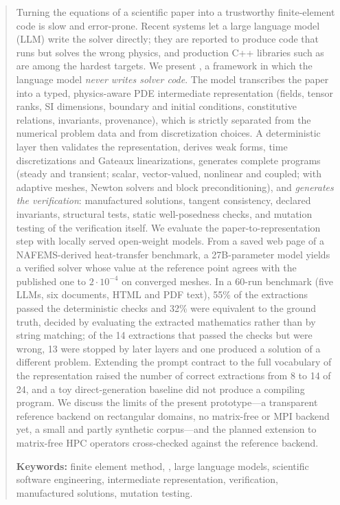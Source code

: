 \begin{abstract}
Turning the equations of a scientific paper into a trustworthy finite-element code is slow and error-prone. Recent systems let a large language model (LLM) write the solver directly; they are reported to produce code that runs but solves the wrong physics, and production C++ libraries such as \dealii{} are among the hardest targets. We present \femagent{}, a framework in which the language model \emph{never writes solver code}. The model transcribes the paper into a typed, physics-aware PDE intermediate representation (fields, tensor ranks, SI dimensions, boundary and initial conditions, constitutive relations, invariants, provenance), which is strictly separated from the numerical problem data and from discretization choices. A deterministic layer then validates the representation, derives weak forms, time discretizations and Gateaux linearizations, generates complete \dealii{} programs (steady and transient; scalar, vector-valued, nonlinear and coupled; with adaptive meshes, Newton solvers and block preconditioning), and \emph{generates the verification}: manufactured solutions, tangent consistency, declared invariants, structural tests, static well-posedness checks, and mutation testing of the verification itself. We evaluate the paper-to-representation step with locally served open-weight models. From a saved web page of a NAFEMS-derived heat-transfer benchmark, a 27B-parameter model yields a verified solver whose value at the reference point agrees with the published one to $2\cdot10^{-4}$ on converged meshes. In a 60-run benchmark (five LLMs, six documents, HTML and PDF text), 55\% of the extractions passed the deterministic checks and 32\% were equivalent to the ground truth, decided by evaluating the extracted mathematics rather than by string matching; of the 14 extractions that passed the checks but were wrong, 13 were stopped by later layers and one produced a solution of a different problem. Extending the prompt contract to the full vocabulary of the representation raised the number of correct extractions from 8 to 14 of 24, and a toy direct-generation baseline did not produce a compiling \dealii{} program. We discuss the limits of the present prototype---a transparent reference backend on rectangular domains, no matrix-free or MPI backend yet, a small and partly synthetic corpus---and the planned extension to matrix-free HPC operators cross-checked against the reference backend.

\medskip\noindent\textbf{Keywords:} finite element method, \dealii{}, large language models, scientific software engineering, intermediate representation, verification, manufactured solutions, mutation testing.
\end{abstract}
